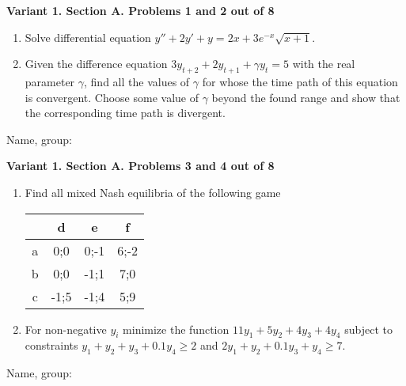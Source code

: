 \documentclass[12pt,a4paper]{article}
\begin{document}


\textbf{Variant 1. Section A. Problems 1 and 2 out of 8}

\begin{enumerate}

\item Solve differential equation $y''+2y'+y=2x+3e^{-x} \sqrt{x+1} $.

\item Given the difference equation $3y_{t+2} +2y_{t+1} +\gamma y_{t} =5$ with the real parameter $\gamma $, find all the values of  $\gamma$ for whose the time path of this equation is convergent.
Choose some value of $\gamma$ beyond the found range and show that the corresponding time path is divergent.



\end{enumerate}


\begin{framed}
\begin{minipage}{42em}
Name, group:\vspace*{3ex}\par
\noindent\dotfill
\end{minipage}
\end{framed}

\newpage
\textbf{Variant 1. Section A. Problems 3 and 4 out of 8}

\begin{enumerate}[resume]

\item Find all mixed Nash equilibria of the following game

\begin{tabular}{c|ccc}
  & d & e & f \\
\midrule
a & 0;0  & 0;-1 & 6;-2 \\
b & 0;0  & -1;1 & 7;0 \\
c & -1;5 & -1;4 & 5;9
\end{tabular}

\item For non-negative $y_i$ minimize the function $11y_1 + 5 y_2 + 4y_3 +4y_4$ subject to constraints $y_1 + y_2 + y_3 +0.1y_4 \geq 2$ and $2y_1+y_2+0.1y_3+y_4 \geq 7$.


\end{enumerate}


\begin{framed}
\begin{minipage}{42em}
Name, group:\vspace*{3ex}\par
\noindent\dotfill
\end{minipage}
\end{framed}
\end{document}
